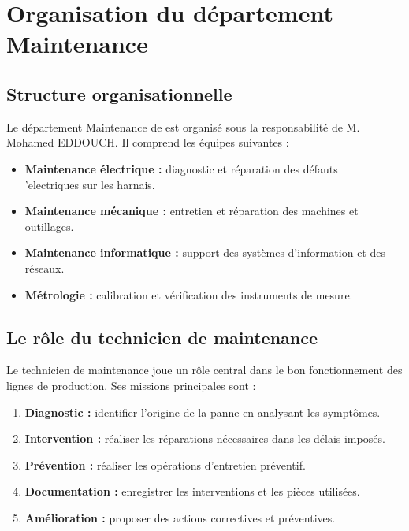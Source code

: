 \section{Organisation du d\'epartement Maintenance}

\subsection{Structure organisationnelle}

Le d\'epartement Maintenance de \sews est organis\'e sous la responsabilit\'e de M. Mohamed EDDOUCH. Il comprend les \'equipes suivantes :

\begin{itemize}
    \item \textbf{Maintenance \'electrique :} diagnostic et r\'eparation des d\'efauts \\'electriques sur les harnais.
    \item \textbf{Maintenance m\'ecanique :} entretien et r\'eparation des machines et outillages.
    \item \textbf{Maintenance informatique :} support des syst\`emes d'information et des r\'eseaux.
    \item \textbf{M\'etrologie :} calibration et v\'erification des instruments de mesure.
\end{itemize}

\subsection{Le r\^ole du technicien de maintenance}

Le technicien de maintenance joue un r\^ole central dans le bon fonctionnement des lignes de production. Ses missions principales sont :

\begin{enumerate}
    \item \textbf{Diagnostic :} identifier l'origine de la panne en analysant les sympt\^omes.
    \item \textbf{Intervention :} r\'ealiser les r\'eparations n\'ecessaires dans les d\'elais impos\'es.
    \item \textbf{Pr\'evention :} r\'ealiser les op\'erations d'entretien pr\'eventif.
    \item \textbf{Documentation :} enregistrer les interventions et les pi\`eces utilis\'ees.
    \item \textbf{Am\'elioration :} proposer des actions correctives et pr\'eventives.
\end{enumerate}

